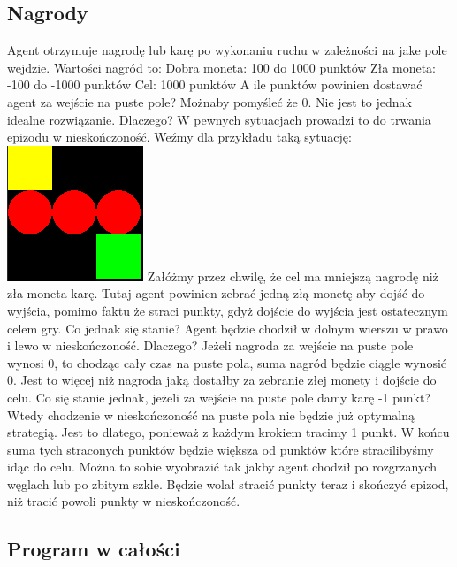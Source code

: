 \documentclass[a4paper,12pt]{article}
\begin{document}
\subsection{Nagrody}

Agent otrzymuje nagrodę lub karę po wykonaniu ruchu w zależności na jake pole wejdzie. Wartości nagród to:
\newline Dobra moneta:  100 do 1000 punktów
\newline Zła moneta: -100 do -1000 punktów
\newline Cel: 1000 punktów
\newline \newline A ile punktów powinien dostawać agent za wejście na puste pole? Możnaby pomyśleć że 0. Nie jest to jednak idealne rozwiązanie. Dlaczego? W pewnych sytuacjach prowadzi to do trwania epizodu w nieskończoność. Weźmy dla przykładu taką sytuację: \newline
\includegraphics{przyklad4.png} \newline
Załóżmy przez chwilę, że cel ma mniejszą nagrodę niż zła moneta karę. Tutaj agent powinien zebrać jedną złą monetę aby dojść do wyjścia, pomimo faktu że straci punkty, gdyż dojście do wyjścia jest ostatecznym celem gry. Co jednak się stanie? Agent będzie chodził w dolnym wierszu w prawo i lewo w nieskończoność. Dlaczego? Jeżeli nagroda za wejście na puste pole wynosi 0, to chodząc cały czas na puste pola, suma nagród będzie ciągle wynosić 0. Jest to więcej niż nagroda jaką dostałby za zebranie złej monety i dojście do celu.
\newline Co się stanie jednak, jeżeli za wejście na puste pole damy karę -1 punkt? Wtedy chodzenie w nieskończoność na puste pola nie będzie już optymalną strategią. Jest to dlatego, ponieważ z każdym krokiem tracimy 1 punkt. W końcu suma tych straconych punktów będzie większa od punktów które stracilibyśmy idąc do celu. Można to sobie wyobrazić tak jakby agent chodził po rozgrzanych węglach lub po zbitym szkle. Będzie wolał stracić punkty teraz i skończyć epizod, niż tracić powoli punkty w nieskończoność.

\subsection{Program w całości}
\end{document}
